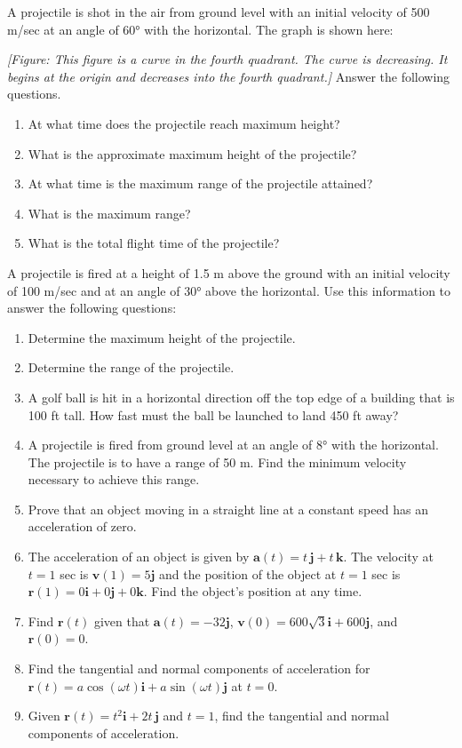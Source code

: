 \documentclass{exercises}
\begin{document}
A projectile is shot in the air from ground level with an initial velocity of 500 m/sec at an angle of 60° with the horizontal. The graph is shown here:


\textit{[Figure: This figure is a curve in the fourth quadrant. The curve is decreasing. It begins at the origin and decreases into the fourth quadrant.]} Answer the following questions.

\begin{enumerate}[resume]
\item At what time does the projectile reach maximum height?
\item What is the approximate maximum height of the projectile?
\item At what time is the maximum range of the projectile attained?
\item What is the maximum range?
\item What is the total flight time of the projectile?
\end{enumerate}

A projectile is fired at a height of 1.5 m above the ground with an initial velocity of 100 m/sec and at an angle of 30° above the horizontal. Use this information to answer the following questions:

\begin{enumerate}[resume]
\item Determine the maximum height of the projectile.
\item Determine the range of the projectile.
\item A golf ball is hit in a horizontal direction off the top edge of a building that is 100 ft tall. How fast must the ball be launched to land 450 ft away?
\item A projectile is fired from ground level at an angle of 8° with the horizontal. The projectile is to have a range of 50 m. Find the minimum velocity necessary to achieve this range.
\item Prove that an object moving in a straight line at a constant speed has an acceleration of zero.
\item The acceleration of an object is given by $\mathbf{a}(t)=t\,\mathbf{j}+t\,\mathbf{k}$. The velocity at $t=1$ sec is $\mathbf{v}(1)=5\mathbf{j}$ and the position of the object at $t=1$ sec is $\mathbf{r}(1)=0\mathbf{i}+0\mathbf{j}+0\mathbf{k}$. Find the object's position at any time.
\item Find $\mathbf{r}(t)$ given that $\mathbf{a}(t)=-32\mathbf{j}$, $\mathbf{v}(0)=600\sqrt{3}\mathbf{i}+600\mathbf{j}$, and $\mathbf{r}(0)=0$.
\item Find the tangential and normal components of acceleration for $\mathbf{r}(t)=a\cos(\omega t)\mathbf{i}+a\sin(\omega t)\mathbf{j}$ at $t=0$.
\item Given $\mathbf{r}(t)=t^{2}\mathbf{i}+2t\,\mathbf{j}$ and $t=1$, find the tangential and normal components of acceleration.
\end{enumerate}
\end{document}
